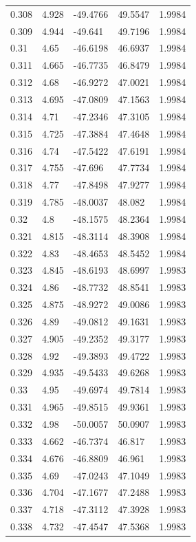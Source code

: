 \begin{tabular}{lllll}
0.308 & 4.928 & -49.4766 & 49.5547 & 1.9984 \\
0.309 & 4.944 & -49.641 & 49.7196 & 1.9984 \\
0.31 & 4.65 & -46.6198 & 46.6937 & 1.9984 \\
0.311 & 4.665 & -46.7735 & 46.8479 & 1.9984 \\
0.312 & 4.68 & -46.9272 & 47.0021 & 1.9984 \\
0.313 & 4.695 & -47.0809 & 47.1563 & 1.9984 \\
0.314 & 4.71 & -47.2346 & 47.3105 & 1.9984 \\
0.315 & 4.725 & -47.3884 & 47.4648 & 1.9984 \\
0.316 & 4.74 & -47.5422 & 47.6191 & 1.9984 \\
0.317 & 4.755 & -47.696 & 47.7734 & 1.9984 \\
0.318 & 4.77 & -47.8498 & 47.9277 & 1.9984 \\
0.319 & 4.785 & -48.0037 & 48.082 & 1.9984 \\
0.32 & 4.8 & -48.1575 & 48.2364 & 1.9984 \\
0.321 & 4.815 & -48.3114 & 48.3908 & 1.9984 \\
0.322 & 4.83 & -48.4653 & 48.5452 & 1.9984 \\
0.323 & 4.845 & -48.6193 & 48.6997 & 1.9983 \\
0.324 & 4.86 & -48.7732 & 48.8541 & 1.9983 \\
0.325 & 4.875 & -48.9272 & 49.0086 & 1.9983 \\
0.326 & 4.89 & -49.0812 & 49.1631 & 1.9983 \\
0.327 & 4.905 & -49.2352 & 49.3177 & 1.9983 \\
0.328 & 4.92 & -49.3893 & 49.4722 & 1.9983 \\
0.329 & 4.935 & -49.5433 & 49.6268 & 1.9983 \\
0.33 & 4.95 & -49.6974 & 49.7814 & 1.9983 \\
0.331 & 4.965 & -49.8515 & 49.9361 & 1.9983 \\
0.332 & 4.98 & -50.0057 & 50.0907 & 1.9983 \\
0.333 & 4.662 & -46.7374 & 46.817 & 1.9983 \\
0.334 & 4.676 & -46.8809 & 46.961 & 1.9983 \\
0.335 & 4.69 & -47.0243 & 47.1049 & 1.9983 \\
0.336 & 4.704 & -47.1677 & 47.2488 & 1.9983 \\
0.337 & 4.718 & -47.3112 & 47.3928 & 1.9983 \\
0.338 & 4.732 & -47.4547 & 47.5368 & 1.9983 \\

\end{tabular}
